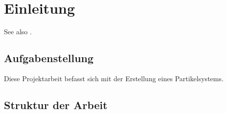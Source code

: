 \chapter{Einleitung}
\textmd{}

See also \cite{gamasutra2000}.

\section{Aufgabenstellung}
\textmd{Diese Projektarbeit befasst sich mit der Erstellung eines Partikelsystems.}

\section{Struktur der Arbeit}
\textmd{}
